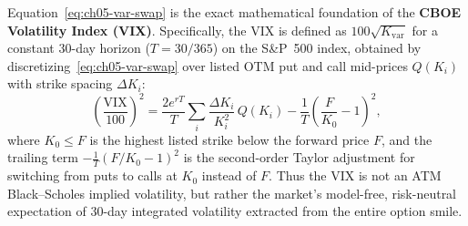 Equation~\eqref{eq:ch05-var-swap} is the exact mathematical foundation of the \textbf{CBOE Volatility Index (VIX)}. Specifically, the VIX is defined as $100\sqrt{K_{\mathrm{var}}}$ for a constant $30$-day horizon ($T = 30/365$) on the S\&P~500 index, obtained by discretizing~\eqref{eq:ch05-var-swap} over listed OTM put and call mid-prices $Q(K_i)$ with strike spacing $\Delta K_i$:
\[
    \left(\frac{\mathrm{VIX}}{100}\right)^2
    = \frac{2 e^{rT}}{T}\sum_i \frac{\Delta K_i}{K_i^2}\,Q(K_i)
    - \frac{1}{T}\left(\frac{F}{K_0} - 1\right)^2,
\]
where $K_0 \le F$ is the highest listed strike below the forward price $F$, and the trailing term $-\frac{1}{T}(F / K_0 - 1)^2$ is the second-order Taylor adjustment for switching from puts to calls at $K_0$ instead of $F$. Thus the VIX is not an ATM Black--Scholes implied volatility, but rather the market's model-free, risk-neutral expectation of $30$-day integrated volatility extracted from the entire option smile.
